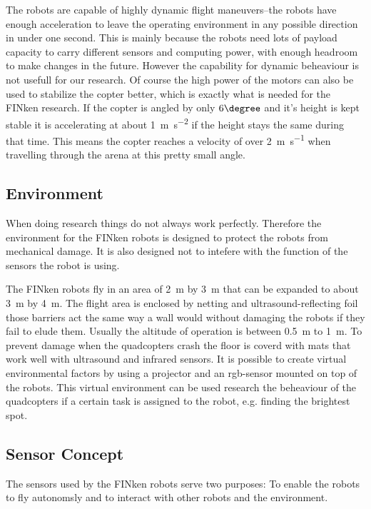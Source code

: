 
The robots are capable of highly dynamic flight maneuvers–the robots have enough acceleration to leave the operating environment in any possible direction in under one second.
This is mainly because the robots need lots of payload capacity to carry different sensors and computing power, with enough headroom to make changes in the future.
However the capability for dynamic beheaviour is not usefull for our research.
Of course the high power of the motors can also be used to stabilize the copter better, which is exactly what is needed for the FINken research.
If the copter is angled by only $6\degree$ and it's height is kept stable it is accelerating at about \SI{1}{\metre\per\square\second} if the height stays the same during that time.
This means the copter reaches a velocity of over \SI{2}{\metre\per\second} when travelling through the arena at this pretty small angle. 

\subsection{Environment}
When doing research things do not always work perfectly.
Therefore the environment for the FINken robots is designed to protect the robots from mechanical damage.
It is also designed not to intefere with the function of the sensors the robot is using. 

The FINken robots fly in an area of \SI{2}{\metre} by \SI{3}{\metre} that can be expanded to about \SI{3}{\metre} by \SI{4}{\metre}.
The flight area is enclosed by netting and ultrasound-reflecting foil those barriers act the same way a wall would without damaging the robots if they fail to elude them.
Usually the altitude of operation is between \SI{0.5}{\metre} to \SI{1}{\metre}.
To prevent damage when the quadcopters crash the floor is coverd with mats that work well with ultrasound and infrared sensors.
It is possible to create virtual environmental factors by using a projector and an rgb-sensor mounted on top of the robots.
This virtual environment can be used research the beheaviour of the quadcopters if a certain task is assigned to the robot, e.g. finding the brightest spot.


\subsection{Sensor Concept}
The sensors used by the FINken robots serve two purposes: To enable the robots to fly autonomsly and to interact with other robots and the environment.

